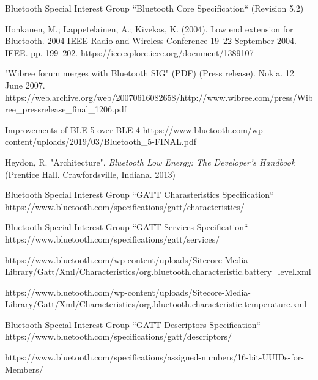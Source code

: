 \begin{thebibliography}{2}


Bluetooth Special Interest Group
``Bluetooth Core Specification``
(Revision 5.2)

Honkanen, M.; Lappetelainen, A.; Kivekas, K. (2004). Low end extension for Bluetooth. 2004 IEEE Radio and Wireless Conference 19–22 September 2004. IEEE. pp. 199–202. https://ieeexplore.ieee.org/document/1389107
 
"Wibree forum merges with Bluetooth SIG" (PDF) (Press release). Nokia. 12 June 2007.
https://web.archive.org/web/20070616082658/http://www.wibree.com/press/Wibree\_pressrelease\_final\_1206.pdf

Improvements of BLE 5 over BLE 4
https://www.bluetooth.com/wp-content/uploads/2019/03/Bluetooth\_5-FINAL.pdf

Heydon, R. "Architecture". {\it Bluetooth Low Energy: The Developer's Handbook}
(Prentice Hall. Crawfordsville, Indiana. 2013)

Bluetooth Special Interest Group
``GATT Charasteristics Specification``
https://www.bluetooth.com/specifications/gatt/characteristics/

Bluetooth Special Interest Group
``GATT Services Specification``
https://www.bluetooth.com/specifications/gatt/services/

https://www.bluetooth.com/wp-content/uploads/Sitecore-Media-Library/Gatt/Xml/Characteristics/org.bluetooth.characteristic.battery\_level.xml

https://www.bluetooth.com/wp-content/uploads/Sitecore-Media-Library/Gatt/Xml/Characteristics/org.bluetooth.characteristic.temperature.xml

Bluetooth Special Interest Group
``GATT Descriptors Specification``
https://www.bluetooth.com/specifications/gatt/descriptors/

https://www.bluetooth.com/specifications/assigned-numbers/16-bit-UUIDs-for-Members/


\end{thebibliography}
